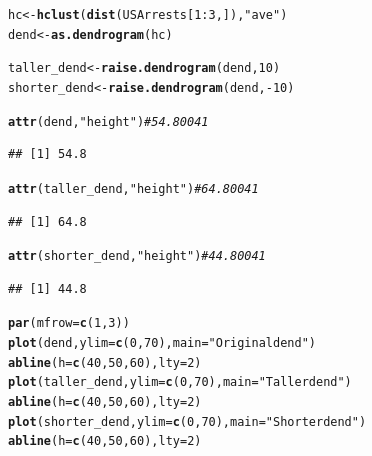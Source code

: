 \documentclass[shortnames,nojss,article]{jss}\usepackage[]{graphicx}\usepackage[]{color}
\makeatletter
\newcommand{\hlnum}[1]{\textcolor[rgb]{0.686,0.059,0.569}{#1}}%
\newcommand{\hlstr}[1]{\textcolor[rgb]{0.192,0.494,0.8}{#1}}%
\newcommand{\hlcom}[1]{\textcolor[rgb]{0.678,0.584,0.686}{\textit{#1}}}%
\newcommand{\hlopt}[1]{\textcolor[rgb]{0,0,0}{#1}}%
\newcommand{\hlstd}[1]{\textcolor[rgb]{0.345,0.345,0.345}{#1}}%
\newcommand{\hlkwb}[1]{\textcolor[rgb]{0.69,0.353,0.396}{#1}}%
\newcommand{\hlkwc}[1]{\textcolor[rgb]{0.333,0.667,0.333}{#1}}%
\newcommand{\hlkwd}[1]{\textcolor[rgb]{0.737,0.353,0.396}{\textbf{#1}}}%
\newenvironment{kframe}{%
 \def\at@end@of@kframe{}%
 \ifinner\ifhmode%
  \def\at@end@of@kframe{\end{minipage}}%
  \begin{minipage}{\columnwidth}%
 \fi\fi%
 \def\FrameCommand##1{\hskip\@totalleftmargin \hskip-\fboxsep
 \colorbox{shadecolor}{##1}\hskip-\fboxsep
     \hskip-\linewidth \hskip-\@totalleftmargin \hskip\columnwidth}%
 \MakeFramed {\advance\hsize-\width
   \@totalleftmargin\z@ \linewidth\hsize
   \@setminipage}}%
 {\par\unskip\endMakeFramed%
 \at@end@of@kframe}
\newenvironment{knitrout}{}{} %
\makeatother
\begin{document}
\begin{knitrout}
\color{fgcolor}\begin{kframe}
\begin{alltt}
\hlstd{hc} \hlkwb{<-} \hlkwd{hclust}\hlstd{(}\hlkwd{dist}\hlstd{(USArrests[}\hlnum{1}\hlopt{:}\hlnum{3}\hlstd{, ]),} \hlstr{"ave"}\hlstd{)}
\hlstd{dend} \hlkwb{<-} \hlkwd{as.dendrogram}\hlstd{(hc}\hlstd{)}

\hlstd{taller_dend} \hlkwb{<-} \hlkwd{raise.dendrogram}\hlstd{(dend,} \hlnum{10}\hlstd{)}
\hlstd{shorter_dend} \hlkwb{<-} \hlkwd{raise.dendrogram}\hlstd{(dend,} \hlopt{-}\hlnum{10}\hlstd{)}

\hlkwd{attr}\hlstd{(dend,} \hlstr{"height"}\hlstd{)}  \hlcom{# 54.80041}
\end{alltt}
\begin{verbatim}
## [1] 54.8
\end{verbatim}
\begin{alltt}
\hlkwd{attr}\hlstd{(taller_dend,} \hlstr{"height"}\hlstd{)}  \hlcom{# 64.80041}
\end{alltt}
\begin{verbatim}
## [1] 64.8
\end{verbatim}
\begin{alltt}
\hlkwd{attr}\hlstd{(shorter_dend,} \hlstr{"height"}\hlstd{)}  \hlcom{# 44.80041}
\end{alltt}
\begin{verbatim}
## [1] 44.8
\end{verbatim}
\begin{alltt}
\hlkwd{par}\hlstd{(}\hlkwc{mfrow} \hlstd{=} \hlkwd{c}\hlstd{(}\hlnum{1}\hlstd{,} \hlnum{3}\hlstd{))}
\hlkwd{plot}\hlstd{(dend,} \hlkwc{ylim} \hlstd{=} \hlkwd{c}\hlstd{(}\hlnum{0}\hlstd{,} \hlnum{70}\hlstd{),} \hlkwc{main} \hlstd{=} \hlstr{"Original dend"}\hlstd{)}
\hlkwd{abline}\hlstd{(}\hlkwc{h} \hlstd{=} \hlkwd{c}\hlstd{(}\hlnum{40}\hlstd{,} \hlnum{50}\hlstd{,} \hlnum{60}\hlstd{),} \hlkwc{lty} \hlstd{=} \hlnum{2}\hlstd{)}
\hlkwd{plot}\hlstd{(taller_dend,} \hlkwc{ylim} \hlstd{=} \hlkwd{c}\hlstd{(}\hlnum{0}\hlstd{,} \hlnum{70}\hlstd{),} \hlkwc{main} \hlstd{=} \hlstr{"Taller dend"}\hlstd{)}
\hlkwd{abline}\hlstd{(}\hlkwc{h} \hlstd{=} \hlkwd{c}\hlstd{(}\hlnum{40}\hlstd{,} \hlnum{50}\hlstd{,} \hlnum{60}\hlstd{),} \hlkwc{lty} \hlstd{=} \hlnum{2}\hlstd{)}
\hlkwd{plot}\hlstd{(shorter_dend,} \hlkwc{ylim} \hlstd{=} \hlkwd{c}\hlstd{(}\hlnum{0}\hlstd{,} \hlnum{70}\hlstd{),} \hlkwc{main} \hlstd{=} \hlstr{"Shorter dend"}\hlstd{)}
\hlkwd{abline}\hlstd{(}\hlkwc{h} \hlstd{=} \hlkwd{c}\hlstd{(}\hlnum{40}\hlstd{,} \hlnum{50}\hlstd{,} \hlnum{60}\hlstd{),} \hlkwc{lty} \hlstd{=} \hlnum{2}\hlstd{)}
\end{alltt}
\end{kframe}


\end{knitrout}
\end{document}
